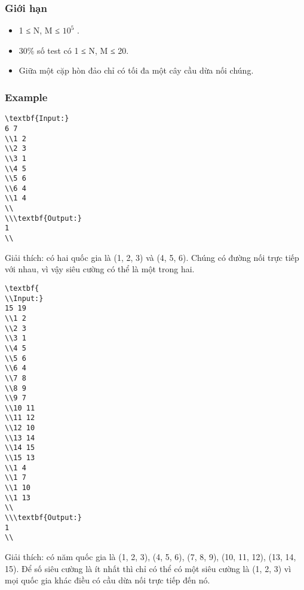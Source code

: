 \subsubsection{   Giới hạn  }
\begin{itemize}
	\item     1 ≤ N, M ≤ $10^{5}$    .   
	\item     30\% số test có 1 ≤ N, M ≤ 20.   
	\item     Giữa một cặp hòn đảo chỉ có tối đa một cây cầu dừa nối chúng.   
\end{itemize}

\subsubsection{   Example  }
\begin{verbatim}
\textbf{Input:}
6 7
\\1 2
\\2 3
\\3 1
\\4 5
\\5 6
\\6 4
\\1 4
\\
\\\textbf{Output:}
1
\\\end{verbatim}

Giải thích: có hai quốc gia là (1, 2, 3) và (4, 5, 6). Chúng có đường nối trực tiếp với nhau, vì vậy siêu cường có thể là một trong hai.
\begin{verbatim}
\textbf{
\\Input:}
15 19
\\1 2
\\2 3
\\3 1
\\4 5
\\5 6
\\6 4
\\7 8
\\8 9
\\9 7
\\10 11
\\11 12
\\12 10
\\13 14
\\14 15
\\15 13
\\1 4
\\1 7
\\1 10
\\1 13
\\
\\\textbf{Output:}
1
\\\end{verbatim}

Giải thích: có năm quốc gia là (1, 2, 3), (4, 5, 6), (7, 8, 9), (10, 11, 12), (13, 14, 15). Để số siêu cường là ít nhất thì chỉ có thể có một siêu cường là (1, 2, 3) vì mọi quốc gia khác điều có cầu dừa nối trực tiếp đến nó.
